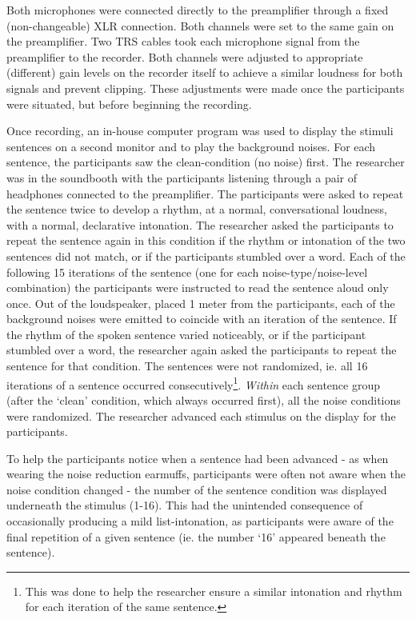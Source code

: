 Both microphones were connected directly to the preamplifier through a fixed (non-changeable) XLR connection.  Both channels were set to the same gain on the preamplifier.  Two TRS cables took each microphone signal from the preamplifier to the recorder.  Both channels were adjusted to appropriate (different) gain levels on the recorder itself to achieve a similar loudness for both signals and prevent clipping.  These adjustments were made once the participants were situated, but before beginning the recording.

Once recording, an in-house computer program was used to display the stimuli sentences on a second monitor and to play the background noises.  For each sentence, the participants saw the clean-condition (no noise) first.  The researcher was in the soundbooth with the participants listening through a pair of headphones connected to the preamplifier.  The participants were asked to repeat the sentence twice to develop a rhythm, at a normal, conversational loudness, with a normal, declarative intonation.  The researcher asked the participants to repeat the sentence again in this condition if the rhythm or intonation of the two sentences did not match, or if the participants stumbled over a word.  Each of the following 15 iterations of the sentence (one for each noise-type/noise-level combination) the participants were instructed to read the sentence aloud only once.  Out of the loudspeaker, placed 1 meter from the participants, each of the background noises were emitted to coincide with an iteration of the sentence.  If the rhythm of the spoken sentence varied noticeably, or if the participant stumbled over a word, the researcher again asked the participants to repeat the sentence for that condition.  The sentences were not randomized, ie. all 16 iterations of a sentence occurred consecutively\footnote{This was done to help the researcher ensure a similar intonation and rhythm for each iteration of the same sentence.}. \textit{Within} each sentence group (after the `clean' condition, which always occurred first), all the noise conditions were randomized. The researcher advanced each stimulus on the display for the participants.

To help the participants notice when a sentence had been advanced - as when wearing the noise reduction earmuffs, participants were often not aware when the noise condition changed - the number of the sentence condition was displayed underneath the stimulus (1-16).  This had the unintended consequence of occasionally producing a mild list-intonation, as participants were aware of the final repetition of a given sentence (ie. the number `16' appeared beneath the sentence). 

